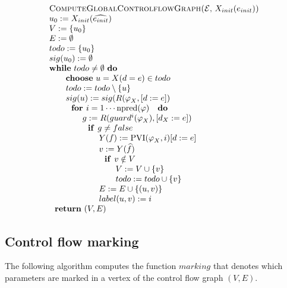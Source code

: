 \begin{equation*}
\begin{tabular}{l}
\textsc{ComputeGlobalControlflowGraph(}$\mathcal{E}$, $X_{init}(e_{init})$%
\textsc{)} \\ 
$u_{0}:=X_{init}(\widehat{e_{init}})$ \\ 
$V:=\{u_{0}\}$ \\ 
$E:=\emptyset $ \\ 
$todo:=\{u_{0}\}$ \\ 
$sig(u_{0}):=\emptyset $ \\ 
\textbf{while} $todo\neq \emptyset $ \textbf{do} \\ 
$\qquad $\textbf{choose} $u=X(d=e)\in todo$ \\ 
$\qquad todo:=todo\setminus \{u\}$ \\ 
$\qquad sig(u):=sig(R(\varphi _{X},[d:=e])$ \\ 
$\qquad \text{\textbf{for }}i=1\cdots \mathrm{npred}(\varphi )\text{ \textbf{%
do}}$ \\ 
$\qquad \qquad g:=R(guard^{i}(\varphi _{X}),[d_{X}:=e])$ \\ 
$\qquad \qquad \text{\textbf{if }}g\neq false$ \\ 
$\qquad \qquad \qquad Y(f):=\mathrm{PVI}(\varphi _{X},i)[d:=e]$ \\ 
$\qquad \qquad \qquad v:=Y(\widehat{f})$ \\ 
$\qquad \qquad \qquad \text{\textbf{if }}v\notin V$ \\ 
$\qquad \qquad \qquad \qquad V:=V\cup \{v\}$ \\ 
$\qquad \qquad \qquad \qquad todo:=todo\cup \{v\}$ \\ 
$\qquad \qquad \qquad E:=E\cup \{(u,v)\}$ \\ 
$\qquad \qquad \qquad label(u,v):=i$ \\ 
$\text{\textbf{return} }(V,E)$%
\end{tabular}%
\end{equation*}

\newpage

\subsection{\protect\bigskip Control flow marking}

The following algorithm computes the function $marking$ that denotes which
parameters are marked in a vertex of the control flow graph $(V,E)$.

